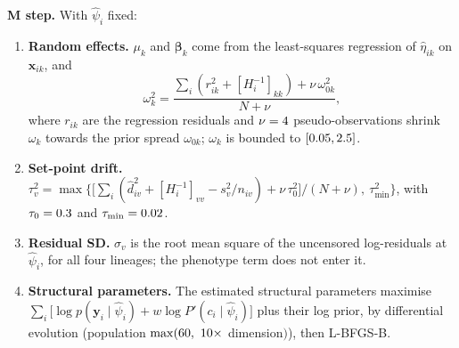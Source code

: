 \documentclass[11pt]{article}
\begin{document}
\textbf{M step.} With $\hat\psi_i$ fixed:
\begin{enumerate}
\item \textbf{Random effects.} $\mu_k$ and $\boldsymbol\beta_k$ come from the least-squares regression of $\hat\eta_{ik}$ on $\mathbf x_{ik}$, and
\[
\omega_k^2=\frac{\sum_i(r_{ik}^2+[H_i^{-1}]_{kk})+\nu\,\omega_{0k}^2}{N+\nu},
\]
where $r_{ik}$ are the regression residuals and $\nu=4$ pseudo-observations shrink $\omega_k$ towards the prior spread $\omega_{0k}$; $\omega_k$ is bounded to $[0.05,2.5]$.
\item \textbf{Set-point drift.} $\tau_v^2=\max\bigl\{\bigl[\sum_i(\hat d_{iv}^2+[H_i^{-1}]_{vv}-s_v^2/n_{iv})+\nu\,\tau_0^2\bigr]/(N+\nu),\ \tau_{\min}^2\bigr\}$, with $\tau_0=0.3$ and $\tau_{\min}=0.02$.
\item \textbf{Residual SD.} $\sigma_v$ is the root mean square of the uncensored log-residuals at $\hat\psi_i$, for all four lineages; the phenotype term does not enter it.
\item \textbf{Structural parameters.} The estimated structural parameters maximise $\sum_i\bigl[\log p(\mathbf y_i\mid\hat\psi_i)+w\log P'(c_i\mid\hat\psi_i)\bigr]$ plus their log prior, by differential evolution (population $\max(\valDeStructNpMin,\ \valDeStructNpDim\times$ dimension$)$), then L-BFGS-B.
\end{enumerate}
\end{document}
